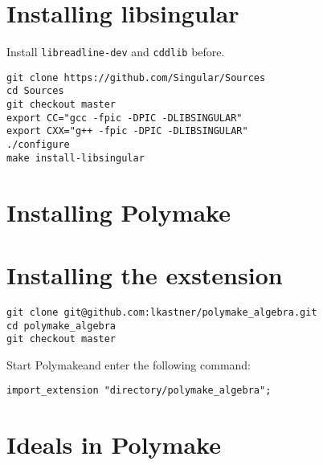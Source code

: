 \documentclass[a4paper]{article}
\newcommand{\pm}{Polymake}
\begin{document}
\section{Installing libsingular}
Install {\tt libreadline-dev} and {\tt cddlib} before.
\begin{verbatim}
git clone https://github.com/Singular/Sources
cd Sources
git checkout master
export CC="gcc -fpic -DPIC -DLIBSINGULAR"
export CXX="g++ -fpic -DPIC -DLIBSINGULAR"
./configure
make install-libsingular
\end{verbatim}
\section{Installing Polymake}

\section{Installing the exstension}

\begin{verbatim}
git clone git@github.com:lkastner/polymake_algebra.git
cd polymake_algebra
git checkout master
\end{verbatim}

Start \pm and enter the following command:
\begin{verbatim}
import_extension "directory/polymake_algebra";
\end{verbatim}
\section{Ideals in Polymake}
\end{document}
